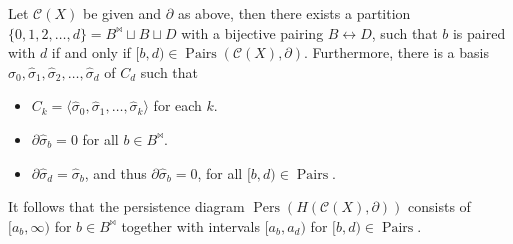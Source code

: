 \begin{theorem}
	{\cite[Theorem 2.6]{de2011dualities}} \label{persistencepartition} Let $\mathcal{C}(X)$ be given and $\partial$ as above, then there
	exists a partition $\{0,1,2, \ldots, d\} = B^{\Join} \sqcup B \sqcup D$ with a bijective pairing $B \leftrightarrow D$, such that $b$ is paired with $d$ if and only if $[b,d) \in \operatorname{Pairs}(\mathcal{C}(X), \partial)$. Furthermore, there is a basis
	$\hat{\sigma}_{0}, \hat{\sigma}_{1}, \hat{\sigma}_{2}, \ldots, \hat{\sigma}_{d}$ of $C_d$ such
	that
	\begin{itemize}
		\item $C_k = \langle \hat{\sigma}_{0}, \hat{\sigma}_{1}, \ldots, \hat{\sigma}_{k} \rangle$ for
			each $k$.
		\item $\partial\hat{\sigma}_{b} = 0$ for all $b \in B^{\Join}$.
		\item $\partial\hat{\sigma}_{d} = \hat{\sigma}_{b}$, and thus
			$\partial\hat{\sigma}_{b} = 0$, for all $[b,d) \in \operatorname{Pairs}$.
	\end{itemize}
	It follows that the persistence diagram
	$\operatorname{Pers}(H(\mathcal{C}(X),\partial))$ consists of $[a_{b}, \infty)$ for
	$b \in B^{\Join}$ together with intervals $[a_{b},a_{d})$ for
	$[b,d) \in \operatorname{Pairs}$.
\end{theorem}


